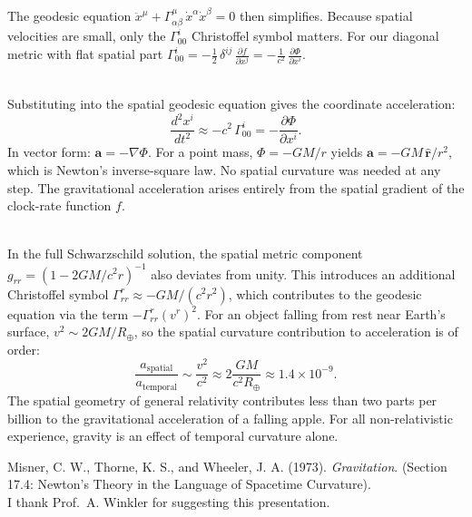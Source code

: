 \begin{technical}
The geodesic equation \( \ddot{x}^\mu + \Gamma^\mu_{\alpha\beta}\, \dot{x}^\alpha \dot{x}^\beta = 0 \) then simplifies. Because spatial velocities are small, only the \( \Gamma^i_{00} \) Christoffel symbol matters. For our diagonal metric with flat spatial part $\Gamma^i_{00} = -\frac{1}{2}\, \delta^{ij}\, \frac{\partial f}{\partial x^j} = -\frac{1}{c^2}\, \frac{\partial \Phi}{\partial x^i}$.

\vspace{0.5em}
\\[0.5em]
Substituting into the spatial geodesic equation gives the coordinate acceleration:
\begin{equation*}
\frac{d^2 x^i}{dt^2} \approx -c^2\, \Gamma^i_{00} = -\frac{\partial \Phi}{\partial x^i}.
\end{equation*}
In vector form: \( \mathbf{a} = -\nabla \Phi \). For a point mass, \( \Phi = -GM/r \) yields \( \mathbf{a} = -GM\,\hat{\mathbf{r}}/r^2 \), which is Newton's inverse-square law. No spatial curvature was needed at any step. The gravitational acceleration arises entirely from the spatial gradient of the clock-rate function \( f \).

\vspace{0.5em}
\\[0.5em]
In the full Schwarzschild solution, the spatial metric component \( g_{rr} = (1 - 2GM/c^2 r)^{-1} \) also deviates from unity. This introduces an additional Christoffel symbol \( \Gamma^r_{rr} \approx -GM/(c^2 r^2) \), which contributes to the geodesic equation via the term \( -\Gamma^r_{rr}(v^r)^2 \). For an object falling from rest near Earth's surface, \( v^2 \sim 2GM/R_\oplus \), so the spatial curvature contribution to acceleration is of order:
\begin{equation*}
\frac{a_{\text{spatial}}}{a_{\text{temporal}}} \sim \frac{v^2}{c^2} \approx 2\frac{GM}{c^2 R_\oplus} \approx 1.4 \times 10^{-9}.
\end{equation*}
The spatial geometry of general relativity contributes less than two parts per billion to the gravitational acceleration of a falling apple. For all non-relativistic experience, gravity is an effect of temporal curvature alone.

\techref
{\footnotesize
Misner, C. W., Thorne, K. S., and Wheeler, J. A. (1973). \textit{Gravitation}. (Section 17.4: Newton's Theory in the Language of Spacetime Curvature). \\
I thank Prof.\ A. Winkler for suggesting this presentation.
}
\end{technical}
